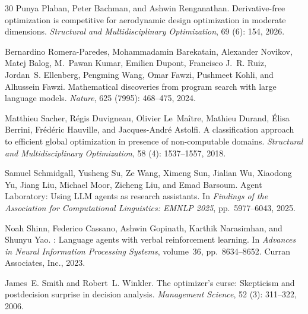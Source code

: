 \documentclass{article} %
\begin{document}
\begin{thebibliography}{30}
Punya Plaban, Peter Bachman, and Ashwin Renganathan.
\newblock Derivative-free optimization is competitive for aerodynamic design optimization in moderate dimensions.
\newblock \emph{Structural and Multidisciplinary Optimization}, 69 (6): 154, 2026.

Bernardino Romera-Paredes, Mohammadamin Barekatain, Alexander Novikov, Matej Balog, M.~Pawan Kumar, Emilien Dupont, Francisco J.~R. Ruiz, Jordan~S. Ellenberg, Pengming Wang, Omar Fawzi, Pushmeet Kohli, and Alhussein Fawzi.
\newblock Mathematical discoveries from program search with large language models.
\newblock \emph{Nature}, 625 (7995): 468--475, 2024.

Matthieu Sacher, R{\'e}gis Duvigneau, Olivier Le~Ma{\^i}tre, Mathieu Durand, {\'E}lisa Berrini, Fr{\'e}d{\'e}ric Hauville, and Jacques-Andr{\'e} Astolfi.
\newblock A classification approach to efficient global optimization in presence of non-computable domains.
\newblock \emph{Structural and Multidisciplinary Optimization}, 58 (4): 1537--1557, 2018.

Samuel Schmidgall, Yusheng Su, Ze Wang, Ximeng Sun, Jialian Wu, Xiaodong Yu, Jiang Liu, Michael Moor, Zicheng Liu, and Emad Barsoum.
\newblock Agent {Laboratory}: Using {LLM} agents as research assistants.
\newblock In \emph{Findings of the Association for Computational Linguistics: EMNLP 2025}, pp.\  5977--6043, 2025.

Noah Shinn, Federico Cassano, Ashwin Gopinath, Karthik Narasimhan, and Shunyu Yao.
: Language agents with verbal reinforcement learning.
\newblock In \emph{Advances in Neural Information Processing Systems}, volume~36, pp.\  8634--8652. Curran Associates, Inc., 2023.

James~E. Smith and Robert~L. Winkler.
\newblock The optimizer's curse: Skepticism and postdecision surprise in decision analysis.
\newblock \emph{Management Science}, 52 (3): 311--322, 2006.


\end{thebibliography}
\end{document}
